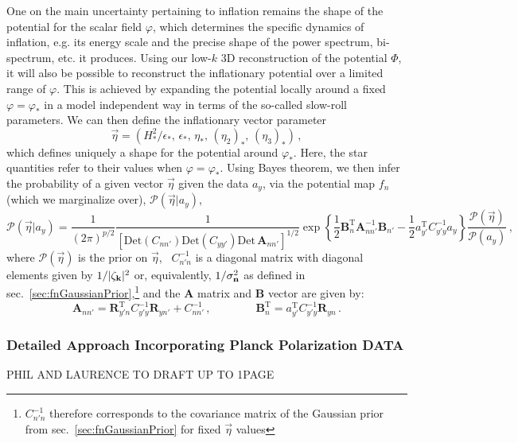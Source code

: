 \documentclass[psfig,11pt]{article}
\def\be{\begin{equation}}
\def\ee{\end{equation}}
\begin{document}
One on the main uncertainty pertaining to inflation remains the shape of the potential for the scalar field $\varphi$, which determines the specific dynamics of inflation, e.g. its energy scale and the precise shape of the power spectrum, bi-spectrum, etc. it produces. Using our low-$k$ 3D reconstruction of the potential $\Phi$, it will also be possible to reconstruct the inflationary potential over a limited range of $\varphi$. This is achieved by expanding the potential locally around a fixed $\varphi=\varphi_*$ in a model independent way in terms of the so-called slow-roll parameters. We can then define the inflationary vector parameter
\be
	\vec{\eta}=\left(H^2_*/\epsilon_*,\, \epsilon_*, \,\eta_*, \, (\eta_2)_*, \,(\eta_3)_*\right)\, ,
\ee
which defines uniquely a shape for the potential around $\varphi_*$. Here, the star quantities refer to their values when $\varphi=\varphi_*$. Using Bayes theorem, we then infer the probability of a given vector $\vec{\eta}$ given the data $a_y$, via the potential map $f_n$ (which we marginalize over), $\mathcal{P}(\vec{\eta}| a_{y})$,
\be
\mathcal{P}(\vec{\eta}| a_{y})=\frac{1}{(2\pi)^{p/2}} \frac{1}{\left[\mathrm{Det}(C_{nn'})\mathrm{Det}(C_{yy'})\mathrm{Det}\,\mathbf{A}_{nn'}\right]^{1/2}}\exp\left\{\frac{1}{2}\mathbf{B}_{n}^{\mathrm{T}}\mathbf{A}_{nn'}^{-1}\mathbf{B}_{n'}-\frac{1}{2}a^{\mathrm{T}}_{y'}C_{y'y}^{-1}a_{y} \right\}\frac{\mathcal{P}(\vec{\eta})}{\mathcal{P}(a_{y})}\, ,
\ee
where $\mathcal{P}(\vec{\eta})$ is the prior on $\vec{\eta}$, ~$C_{n'n}^{-1}$ is a diagonal matrix with diagonal elements given by $1/|\zeta_{{\bf k}}|^2$ or, equivalently, $1/{\sigma_{\bf n}^2}$ as defined in sec.~\ref{sec:fnGaussianPrior},\footnote{$C_{n'n}^{-1}$ therefore corresponds to the covariance matrix of the Gaussian prior from sec.~\ref{sec:fnGaussianPrior} for fixed $\vec{\eta}$ values} and the $\mathbf{A}$ matrix and $\mathbf{B}$ vector are given by:
\be
	\mathbf{A}_{nn'}=\mathbf{R}_{y'n}^{\mathrm{T}}C^{-1}_{y'y} \mathbf{R}_{yn'}+C_{nn'}^{-1}\, ,\qquad \qquad
	 \mathbf{B}_{n}^{\mathrm{T}}=a_{y'}^{\mathrm{T}}C_{y'y}^{-1}\mathbf{R}_{yn}\, .
\ee


\subsubsection{Detailed Approach Incorporating Planck Polarization DATA}

PHIL AND LAURENCE TO DRAFT UP TO 1PAGE
\end{document}
